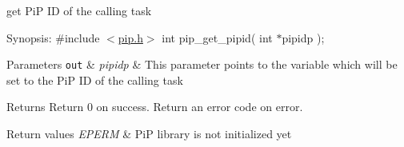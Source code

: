 get Pi\-P I\-D of the calling task

\begin{DoxyParagraph}{Synopsis\-:}
\#include $<$\hyperlink{pip_8h_source}{pip.\-h}$>$ int pip\-\_\-get\-\_\-pipid( int $\ast$pipidp );
\end{DoxyParagraph}

\begin{DoxyParams}[1]{Parameters}
\mbox{\tt out}  & {\em pipidp} & This parameter points to the variable which will be set to the Pi\-P I\-D of the calling task\\
\hline
\end{DoxyParams}
\begin{DoxyReturn}{Returns}
Return 0 on success. Return an error code on error. 
\end{DoxyReturn}

\begin{DoxyRetVals}{Return values}
{\em E\-P\-E\-R\-M} & Pi\-P library is not initialized yet \\
\hline
\end{DoxyRetVals}
